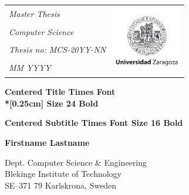 

\pagestyle{plain}


{\pagestyle{empty}
\changepage{5cm}{1cm}{-0.5cm}{-0.5cm}{}{-2cm}{}{}{}
\noindent
{\small
\begin{tabular}{p{} p{}}
\textit{Master Thesis}&\multirow{4}{*}{\includegraphics[height=3cm]{./images/logo.png}}\\
\textit{Computer Science}\\
\textit{Thesis no: MCS-20YY-NN}\\
\textit{MM YYYY}\\
\end{tabular}}

\begin{center}

\par\vspace {7cm}

{\Huge\textbf{Centered Title Times Font\\*[0.25cm] Size 24 Bold}}

\par\vspace {0.5cm}

{\Large\textbf{Centered Subtitle Times Font Size 16 Bold}}

\par\vspace {3cm}

{\Large\textbf{Firstname Lastname}}
\par\vspace {7cm}

\end{center}

\noindent%
{\small Dept. Computer Science \& Engineering \\
Blekinge Institute of Technology\\
SE--371 79 Karlskrona, Sweden}

\clearpage
}
\tableofcontents
